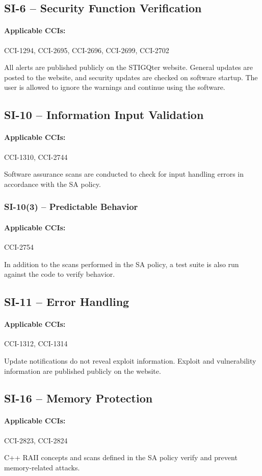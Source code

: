 \documentclass[letterpaper, 10pt, twoside]{article}
\begin{document}
\subsection{SI-6 -- Security Function Verification}

\paragraph{Applicable CCIs:} CCI-1294, CCI-2695, CCI-2696, CCI-2699, CCI-2702

All alerts are published publicly on the STIGQter website. General updates are posted to the website, and security updates are checked on software startup. The user is allowed to ignore the warnings and continue using the software.

\subsection{SI-10 -- Information Input Validation}

\paragraph{Applicable CCIs:} CCI-1310, CCI-2744

Software assurance scans are conducted to check for input handling errors in accordance with the SA policy.

\subsubsection{SI-10(3) -- Predictable Behavior}

\paragraph{Applicable CCIs:} CCI-2754

In addition to the scans performed in the SA policy, a test suite is also run against the code to verify behavior.

\subsection{SI-11 -- Error Handling}

\paragraph{Applicable CCIs:} CCI-1312, CCI-1314

Update notifications do not reveal exploit information. Exploit and vulnerability information are published publicly on the website.

\subsection{SI-16 -- Memory Protection}

\paragraph{Applicable CCIs:} CCI-2823, CCI-2824

C++ RAII concepts and scans defined in the SA policy verify and prevent memory-related attacks.

\clearpage
\printbibliography
\end{document}
